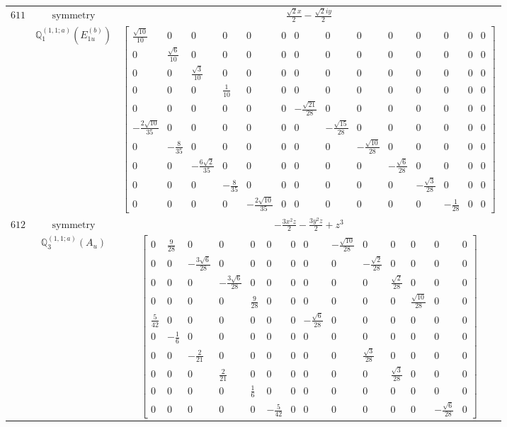 \documentclass[fleqn,8pt,landscape]{jsarticle}
\begin{document}
\begin{longtable}{ccc}
$ 611 $ & $ \text{symmetry} $ & $ \frac{\sqrt{2} x}{2} - \frac{\sqrt{2} i y}{2} $ \\
$  $ & $ \mathbb{Q}_{1}^{(1,1;a)}(E_{1u}^{(b)}) $ & $ \begin{bmatrix} \frac{\sqrt{10}}{10} & 0 & 0 & 0 & 0 & 0 & 0 & 0 & 0 & 0 & 0 & 0 & 0 & 0 \\ 0 & \frac{\sqrt{6}}{10} & 0 & 0 & 0 & 0 & 0 & 0 & 0 & 0 & 0 & 0 & 0 & 0 \\ 0 & 0 & \frac{\sqrt{3}}{10} & 0 & 0 & 0 & 0 & 0 & 0 & 0 & 0 & 0 & 0 & 0 \\ 0 & 0 & 0 & \frac{1}{10} & 0 & 0 & 0 & 0 & 0 & 0 & 0 & 0 & 0 & 0 \\ 0 & 0 & 0 & 0 & 0 & 0 & - \frac{\sqrt{21}}{28} & 0 & 0 & 0 & 0 & 0 & 0 & 0 \\ - \frac{2 \sqrt{10}}{35} & 0 & 0 & 0 & 0 & 0 & 0 & - \frac{\sqrt{15}}{28} & 0 & 0 & 0 & 0 & 0 & 0 \\ 0 & - \frac{8}{35} & 0 & 0 & 0 & 0 & 0 & 0 & - \frac{\sqrt{10}}{28} & 0 & 0 & 0 & 0 & 0 \\ 0 & 0 & - \frac{6 \sqrt{2}}{35} & 0 & 0 & 0 & 0 & 0 & 0 & - \frac{\sqrt{6}}{28} & 0 & 0 & 0 & 0 \\ 0 & 0 & 0 & - \frac{8}{35} & 0 & 0 & 0 & 0 & 0 & 0 & - \frac{\sqrt{3}}{28} & 0 & 0 & 0 \\ 0 & 0 & 0 & 0 & - \frac{2 \sqrt{10}}{35} & 0 & 0 & 0 & 0 & 0 & 0 & - \frac{1}{28} & 0 & 0 \end{bmatrix} $ \\ \hline
$ 612 $ & $ \text{symmetry} $ & $ - \frac{3 x^{2} z}{2} - \frac{3 y^{2} z}{2} + z^{3} $ \\
$  $ & $ \mathbb{Q}_{3}^{(1,1;a)}(A_{u}) $ & $ \begin{bmatrix} 0 & \frac{9}{28} & 0 & 0 & 0 & 0 & 0 & 0 & - \frac{\sqrt{10}}{28} & 0 & 0 & 0 & 0 & 0 \\ 0 & 0 & - \frac{3 \sqrt{6}}{28} & 0 & 0 & 0 & 0 & 0 & 0 & - \frac{\sqrt{2}}{28} & 0 & 0 & 0 & 0 \\ 0 & 0 & 0 & - \frac{3 \sqrt{6}}{28} & 0 & 0 & 0 & 0 & 0 & 0 & \frac{\sqrt{2}}{28} & 0 & 0 & 0 \\ 0 & 0 & 0 & 0 & \frac{9}{28} & 0 & 0 & 0 & 0 & 0 & 0 & \frac{\sqrt{10}}{28} & 0 & 0 \\ \frac{5}{42} & 0 & 0 & 0 & 0 & 0 & 0 & - \frac{\sqrt{6}}{28} & 0 & 0 & 0 & 0 & 0 & 0 \\ 0 & - \frac{1}{6} & 0 & 0 & 0 & 0 & 0 & 0 & 0 & 0 & 0 & 0 & 0 & 0 \\ 0 & 0 & - \frac{2}{21} & 0 & 0 & 0 & 0 & 0 & 0 & \frac{\sqrt{3}}{28} & 0 & 0 & 0 & 0 \\ 0 & 0 & 0 & \frac{2}{21} & 0 & 0 & 0 & 0 & 0 & 0 & \frac{\sqrt{3}}{28} & 0 & 0 & 0 \\ 0 & 0 & 0 & 0 & \frac{1}{6} & 0 & 0 & 0 & 0 & 0 & 0 & 0 & 0 & 0 \\ 0 & 0 & 0 & 0 & 0 & - \frac{5}{42} & 0 & 0 & 0 & 0 & 0 & 0 & - \frac{\sqrt{6}}{28} & 0 \end{bmatrix} $ \\ \hline

\end{longtable}
\end{document}
